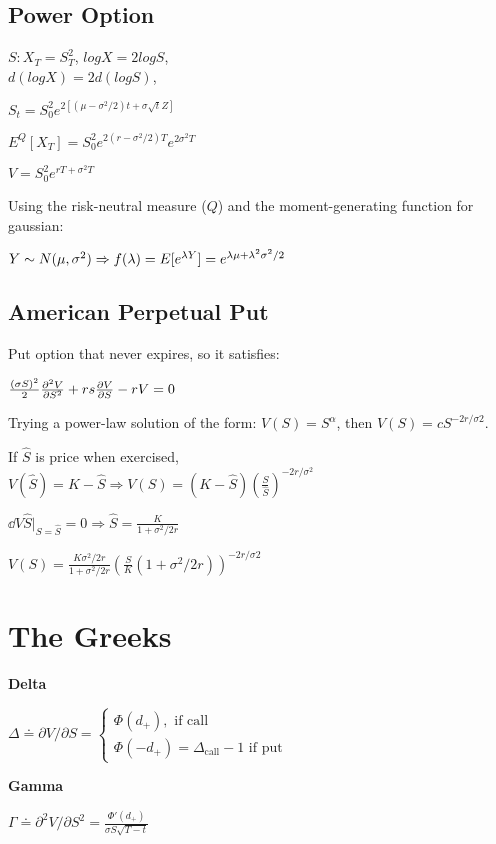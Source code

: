 \subsection{Power Option}

$S: X_T = S_T^2$, $log X = 2 log S$, \\ $d(log X) = 2 d (log S)$, 

$S_t = S^2_0 e^{2 [ (\mu - \sigma^2/2)t + \sigma \sqrt{t}Z]}$

$E^Q[X_T] = S_0^2 e^{2(r - \sigma^2/2)T}e^{2\sigma^2T}$

$V = S_0^2 e^{rT + \sigma^2 T}$

Using the risk-neutral measure ($Q$) and the moment-generating function for gaussian:

$Y \sim N(\mu, \sigma^2) \Rightarrow \\f(\lambda) = E[e^{\lambda Y}] = e^{\lambda \mu + \lambda^2\sigma^2/2}$

\subsection{American Perpetual Put}

Put option that never expires, so it satisfies: 

$\frac{(\sigma S)^2}{2} \frac{\partial^{2} V}{\partial S^{2}} + rs \frac{\partial V}{\partial S} - rV = 0$

Trying a power-law solution of the form: $V(S) = S^\alpha$, then $V(S) = cS^{-2r/\sigma2}$. 

If $\hat S$ is price when exercised, \\$V(\hat S) = K - \hat S \Rightarrow V(S) = (K-\hat S)(\frac{S}{\hat S})^{-2r/\sigma^2}$

$\dd{V}{\hat S} |_{S = \hat S}=0 \Rightarrow \hat S = \frac{K}{1+\sigma^2/2r}$

$V(S) = \frac{K\sigma^2/2r}{1+\sigma^2/2r}(\frac{S}{K}(1+\sigma^2/2r))^{-2r/\sigma2}$
\section{The Greeks}

\textbf{Delta} 

$\Delta \doteq \partial V / \partial S = \begin{cases} \Phi(d_+), \text{ if call} \\ \Phi(-d_+) = \Delta_{\text{call}} -1 \text{ if put }\end{cases}$

\textbf{Gamma} 

$\Gamma \doteq \partial^2 V / \partial S^2 = \frac{\Phi'(d_+)}{\sigma S \sqrt{T-t}}$

